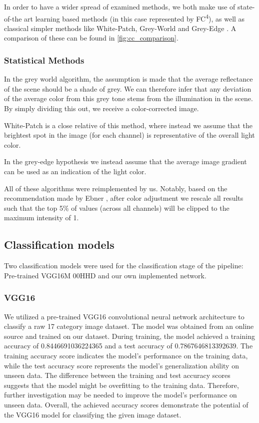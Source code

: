 In order to have a wider spread of examined methods, we both make use of state-of-the art 
learning based methods (in this case represented by FC\textsuperscript{4}\cite{hu2017fc}), as well as classical simpler methods 
like White-Patch, Grey-World \cite{EbnerConstancy} and Grey-Edge \cite{van2005color}.
A comparison of these can be found in \ref{fig:cc_comparison}.

\subsubsection{Statistical Methods}

In the grey world algorithm, the assumption is made that the average reflectance of the scene should
be a shade of grey. We can therefore infer that any deviation of the average color from this grey tone stems from
the illumination in the scene. By simply dividing this out, we receive a color-corrected image.

White-Patch is a close relative of this method, where instead we assume that the brightest spot in the image (for each channel)
is representative of the overall light color.

In the grey-edge hypothesis we instead assume that the average image gradient can be used as an indication of the light color.

All of these algorithms were reimplemented by us. Notably, based on the recommendation made by Ebner \cite{EbnerConstancy},
after color adjustment we rescale all results such that the top 5\% of values (across all channels) will be clipped to
the maximum intensity of 1.

\subsection{Classification models}

Two classification models were used for the classification stage of the pipeline: Pre-trained VGG16M 00HHD and our own implemented network. %

\subsubsection{VGG16}
We utilized a pre-trained VGG16 convolutional neural network architecture to classify a raw 17 category image dataset. 
The model was obtained from an online source and trained on our dataset. During training, the model achieved a training accuracy of 0.8446691036224365 and a test accuracy of 0.7867646813392639. 
The training accuracy score indicates the model's performance on the training data, while the test accuracy score represents the model's generalization ability on unseen data. 
The difference between the training and test accuracy scores suggests that the model might be overfitting to the training data. Therefore, further investigation may be needed to improve the model's performance on unseen data.
Overall, the achieved accuracy scores demonstrate the potential of the VGG16 model for classifying the given image dataset. 

